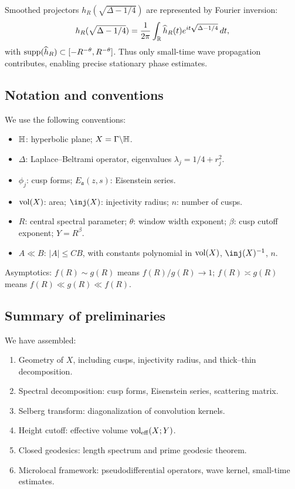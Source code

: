 Smoothed projectors $h_R(\sqrt{\Delta-1/4})$ are represented by Fourier inversion:
\[
h_R(\sqrt{\Delta-1/4}) = \frac{1}{2\pi}\int_{\mathbb{R}} \widehat{h}_R(t) e^{it\sqrt{\Delta-1/4}}\,dt,
\]
with $\operatorname{supp}(\widehat{h}_R)\subset [-R^{-\theta},R^{-\theta}]$. Thus only small-time wave propagation contributes, enabling precise stationary phase estimates.

\subsection{Notation and conventions}\label{subsec:notation}

We use the following conventions:
\begin{itemize}
  \item $\mathbb{H}$: hyperbolic plane; $X=\Gamma\backslash\mathbb{H}$.
  \item $\Delta$: Laplace–Beltrami operator, eigenvalues $\lambda_j=1/4+r_j^2$.
  \item $\phi_j$: cusp forms; $E_\mathfrak{a}(z,s)$: Eisenstein series.
  \item $\operatorname{vol}(X)$: area; $\inj(X)$: injectivity radius; $n$: number of cusps.
  \item $R$: central spectral parameter; $\theta$: window width exponent; $\beta$: cusp cutoff exponent; $Y=R^\beta$.
  \item $A\ll B$: $|A|\le C B$, with constants polynomial in $\operatorname{vol}(X)$, $\inj(X)^{-1}$, $n$.
\end{itemize}

Asymptotics: $f(R)\sim g(R)$ means $f(R)/g(R)\to 1$; $f(R)\asymp g(R)$ means $f(R)\ll g(R)\ll f(R)$.

\subsection{Summary of preliminaries}\label{subsec:summary}

We have assembled:
\begin{enumerate}
  \item Geometry of $X$, including cusps, injectivity radius, and thick–thin decomposition.
  \item Spectral decomposition: cusp forms, Eisenstein series, scattering matrix.
  \item Selberg transform: diagonalization of convolution kernels.
  \item Height cutoff: effective volume $\operatorname{vol}_{\mathrm{eff}}(X;Y)$.
  \item Closed geodesics: length spectrum and prime geodesic theorem.
  \item Microlocal framework: pseudodifferential operators, wave kernel, small-time estimates.
\end{enumerate}

